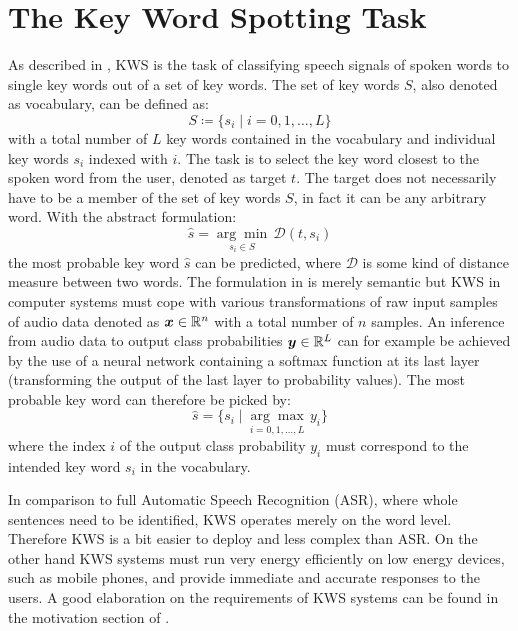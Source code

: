 
\section{The Key Word Spotting Task}\label{sec:intro_kws}
As described in , KWS is the task of classifying speech signals of spoken words to single key words out of a set of key words.
The set of key words $S$, also denoted as vocabulary, can be defined as:
\begin{equation}\label{eq:intro_kws_dict}
	S \coloneqq \{s_i \mid i = 0, 1, \dots, L\}
\end{equation}
with a total number of $L$ key words contained in the vocabulary and individual key words $s_i$ indexed with $i$.
The task is to select the key word closest to the spoken word from the user, denoted as target $t$.
The target does not necessarily have to be a member of the set of key words $S$, in fact it can be any arbitrary word.
With the abstract formulation:
\begin{equation}\label{eq:intro_kws_task}
	\hat{s} = \underset{s_i \in S}{\arg \min} \, \mathcal{D}(t, s_i)
\end{equation}
the most probable key word $\hat{s}$ can be predicted, where $\mathcal{D}$ is some kind of distance measure between two words.
The formulation in  is merely semantic but KWS in computer systems must cope with various transformations of raw input samples of audio data denoted as $\bm{x} \in \mathbb{R}^n$ with a total number of $n$ samples.
An inference from audio data to output class probabilities $\bm{y} \in \mathbb{R}^L$ can for example be achieved by the use of a neural network containing a softmax function at its last layer (transforming the output of the last layer to probability values).
The most probable key word can therefore be picked by:
\begin{equation}\label{eq:intro_kws_class}
	\hat{s} = \{s_i \mid \underset{i = 0, 1, \dots, L}{\arg \max} \, y_i\}
\end{equation}
where the index $i$ of the output class probability $y_i$ must correspond to the intended key word $s_i$ in the vocabulary.

In comparison to full Automatic Speech Recognition (ASR), where whole sentences need to be identified, KWS operates merely on the word level.
Therefore KWS is a bit easier to deploy and less complex than ASR.
On the other hand KWS systems must run very energy efficiently on low energy devices, such as mobile phones, and provide immediate and accurate responses to the users.
A good elaboration on the requirements of KWS systems can be found in the motivation section of \cite{Warden2018}.